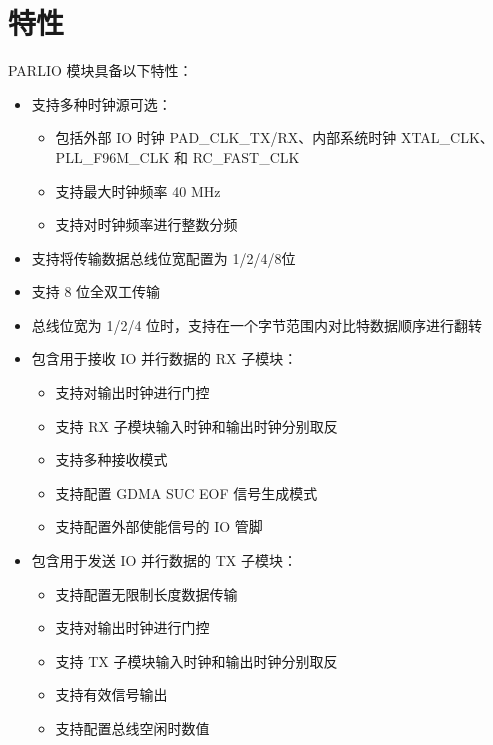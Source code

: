 \documentclass[main\_\_CN.tex]{subfiles}
\begin{document}

\section{特性}
\label{sec:parlio-features}

PARLIO 模块具备以下特性：

\begin{itemize}
    \item 支持多种时钟源可选：
    \begin{itemize}
        \item 包括外部 IO 时钟 PAD\_CLK\_TX/RX、内部系统时钟 XTAL\_CLK、PLL\_F96M\_CLK 和 RC\_FAST\_CLK
        \item 支持最大时钟频率 40 MHz
        \item 支持对时钟频率进行整数分频
    \end{itemize}
    \item 支持将传输数据总线位宽配置为 1/2/4/8位
    \item 支持 8 位全双工传输
    \item 总线位宽为 1/2/4 位时，支持在一个字节范围内对比特数据顺序进行翻转
    \item 包含用于接收 IO 并行数据的 RX 子模块：
    \begin{itemize}
        \item 支持对输出时钟进行门控
        \item 支持 RX 子模块输入时钟和输出时钟分别取反
        \item 支持多种接收模式
        \item 支持配置 GDMA SUC EOF 信号生成模式
        \item 支持配置外部使能信号的 IO 管脚
    \end{itemize}
    \item 包含用于发送 IO 并行数据的 TX 子模块：
    \begin{itemize}
        \item 支持配置无限制长度数据传输
        \item 支持对输出时钟进行门控
        \item 支持 TX 子模块输入时钟和输出时钟分别取反
        \item 支持有效信号输出
        \item 支持配置总线空闲时数值
    \end{itemize}

\end{itemize}
\end{document}
